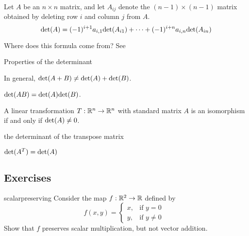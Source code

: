 \begin{theorem}
    Let $A$ be an $n \times n$ matrix, and let $A_{ij}$ denote the $(n-1) \times (n-1)$ matrix obtained by deleting row $i$ and column $j$ from $A$.
    $$\textnormal{det}(A) = (-1)^{i+1}a_{i,1}\textnormal{det}(A_{i1}) + \cdots +  (-1)^{i+n}a_{i,n}\textnormal{det}(A_{in})$$
    
    \end{theorem}

Where does this formula come from? See 




Properties of the determinant
    
    \begin{remark}
    In general, $\textnormal{det}(A+B) \neq \textnormal{det}(A) + \textnormal{det}(B)$.
    \end{remark}
    
    \begin{theorem}

     $\textnormal{det}(AB) = \textnormal{det}(A)\textnormal{det}(B)$.
     
    \end{theorem}
    
    \begin{theorem}
    A linear transformation $T: \mathbb{R}^n \to \mathbb{R}^n$ with standard matrix $A$ is an isomorphism if and only if $\textnormal{det}(A) \neq 0$.
    \end{theorem}


\begin{theorem}
the determinant of the transpose matrix

$\textnormal{det}(A^T) = \textnormal{det}(A)$
\end{theorem}










\subsection{Exercises}

\begin{problem}{scalarpreserving}
Consider the map $f: \mathbb{R}^2 \to \mathbb{R}$ defined by $$f(x,y) =
\begin{cases}
x,  & \text{if $y=0$ } \\
y, & \text{if $y\neq 0$ }
\end{cases}$$
Show that $f$ preserves scalar multiplication, but not vector addition.
\end{problem}

